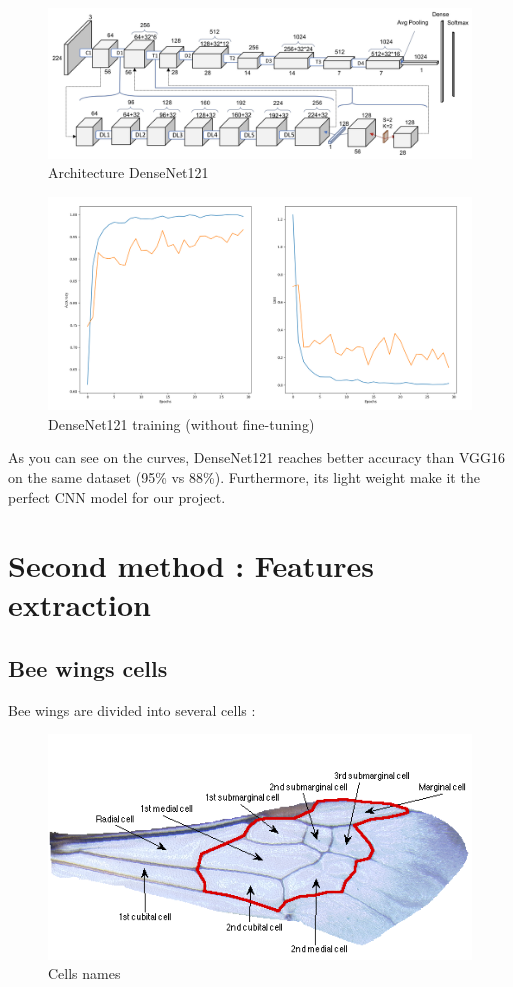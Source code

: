 \documentclass[a4paper]{article}
\begin{document}
\begin{figure}[h]
    \centering
\includegraphics[width=.8\textwidth]{figures/densenet121_architecture.png}
    \caption{Architecture DenseNet121}
\end{figure}

\begin{figure}[h]
    \centering
\includegraphics[width=.8\textwidth]{figures/graph_densenet.png}
    \caption{DenseNet121 training (without fine-tuning)}
\end{figure}

As you can see on the curves, DenseNet121 reaches better accuracy than VGG16 on the same dataset (95\% vs 88\%).
Furthermore, its light weight make it the perfect CNN model for our project.


\section{Second method : Features extraction}

\subsection{Bee wings cells}

Bee wings are divided into several cells :

\begin{figure}[h]
\includegraphics[width=.8\textwidth]{figures/schema_wings2.png}
\caption{Cells names}
\end{figure}
\end{document}
